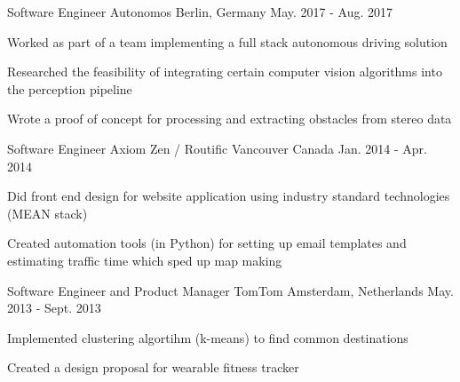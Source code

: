 \begin{cventries}

\cventry
{Software Engineer} %
{Autonomos} %
{Berlin, Germany} %
{May. 2017 - Aug. 2017} %
{ %
\begin{cvitems}
\item {Worked as part of a team implementing a full stack autonomous driving solution}
\item {Researched the feasibility of integrating certain computer vision algorithms into the perception pipeline}
\item {Wrote a proof of concept for processing and extracting obstacles from stereo data}
\end{cvitems}
}




\cventry
{Software Engineer} %
{Axiom Zen / Routific} %
{Vancouver Canada} %
{Jan. 2014 - Apr. 2014} %
{ %
\begin{cvitems}
\item {Did front end design for website application using industry standard technologies (MEAN stack)}
\item {Created automation tools (in Python) for setting up email templates and estimating traffic time which sped up map making}
\end{cvitems} 
}


\cventry
{Software Engineer and Product Manager} %
{TomTom} %
{Amsterdam, Netherlands} %
{May. 2013 - Sept. 2013} %
{ %
\begin{cvitems}
\item {Implemented clustering algortihm (k-means) to find common destinations}
\item {Created a design proposal for wearable fitness tracker}
\end{cvitems}
}


\end{cventries}